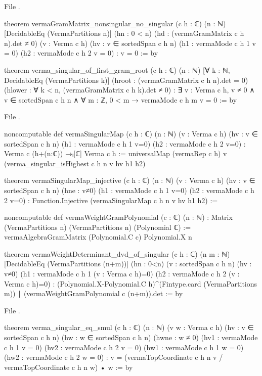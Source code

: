 File .
\begin{leancode}
theorem vermaGramMatrix_nonsingular_no_singular (c h : ℂ) (n : ℕ)
    [DecidableEq (VermaPartitions n)] (hn : 0 < n)
    (hd : (vermaGramMatrix c h n).det ≠ 0)
    (v : Verma c h) (hv : v ∈ sortedSpan c h n)
    (h1 : vermaMode c h 1 v = 0) (h2 : vermaMode c h 2 v = 0) : v = 0 := by

theorem verma_singular_of_first_gram_root (c h : ℂ) (n : ℕ)
    [∀ k : ℕ, DecidableEq (VermaPartitions k)]
    (hroot : (vermaGramMatrix c h n).det = 0)
    (hlower : ∀ k < n, (vermaGramMatrix c h k).det ≠ 0) :
    ∃ v : Verma c h, v ≠ 0 ∧ v ∈ sortedSpan c h n ∧
      ∀ m : ℤ, 0 < m → vermaMode c h m v = 0 := by
\end{leancode}
File .
\begin{leancode}
noncomputable def vermaSingularMap (c h : ℂ) (n : ℕ) (v : Verma c h)
    (hv : v ∈ sortedSpan c h n)
    (h1 : vermaMode c h 1 v=0) (h2 : vermaMode c h 2 v=0) :
    Verma c (h+(n:ℂ)) →ₗ[ℂ] Verma c h :=
  universalMap (vermaRep c h) v (verma_singular_isHighest c h n v hv h1 h2)

theorem vermaSingularMap_injective (c h : ℂ) (n : ℕ) (v : Verma c h)
    (hv : v ∈ sortedSpan c h n) (hne : v≠0)
    (h1 : vermaMode c h 1 v=0) (h2 : vermaMode c h 2 v=0) :
    Function.Injective (vermaSingularMap c h n v hv h1 h2) :=

noncomputable def vermaWeightGramPolynomial (c : ℂ) (n : ℕ) :
    Matrix (VermaPartitions n) (VermaPartitions n) (Polynomial ℂ) :=
  vermaAlgebraGramMatrix (Polynomial.C c) Polynomial.X n

theorem vermaWeightDeterminant_dvd_of_singular (c h : ℂ) (n m : ℕ)
    [DecidableEq (VermaPartitions (n+m))] (hn : 0<n)
    (v : sortedSpan c h n) (hv : v≠0)
    (h1 : vermaMode c h 1 (v : Verma c h)=0)
    (h2 : vermaMode c h 2 (v : Verma c h)=0) :
    (Polynomial.X-Polynomial.C h)^(Fintype.card (VermaPartitions m)) ∣
      (vermaWeightGramPolynomial c (n+m)).det := by
\end{leancode}
File .
\begin{leancode}
theorem verma_singular_eq_smul (c h : ℂ) (n : ℕ) (v w : Verma c h)
    (hv : v ∈ sortedSpan c h n) (hw : w ∈ sortedSpan c h n) (hwne : w ≠ 0)
    (hv1 : vermaMode c h 1 v = 0) (hv2 : vermaMode c h 2 v = 0)
    (hw1 : vermaMode c h 1 w = 0) (hw2 : vermaMode c h 2 w = 0) :
    v = (vermaTopCoordinate c h n v / vermaTopCoordinate c h n w) • w := by
\end{leancode}

